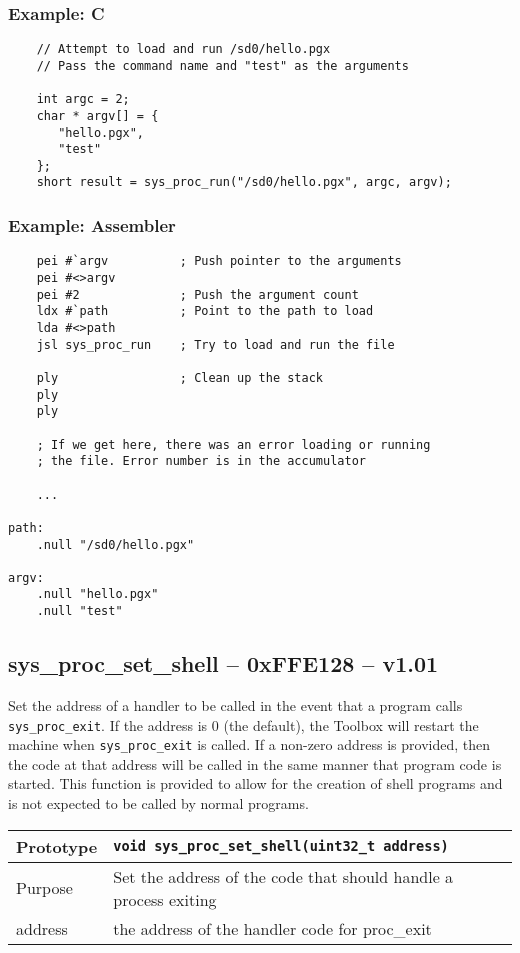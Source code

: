 \subsubsection*{Example: C}
\begin{lstlisting}
    // Attempt to load and run /sd0/hello.pgx
    // Pass the command name and "test" as the arguments

    int argc = 2;
    char * argv[] = {
       "hello.pgx",
       "test"
    };
    short result = sys_proc_run("/sd0/hello.pgx", argc, argv);
\end{lstlisting}

\subsubsection*{Example: Assembler}
\begin{verbatim}
    pei #`argv          ; Push pointer to the arguments
    pei #<>argv
    pei #2              ; Push the argument count
    ldx #`path          ; Point to the path to load
    lda #<>path
    jsl sys_proc_run    ; Try to load and run the file

    ply                 ; Clean up the stack
    ply
    ply

    ; If we get here, there was an error loading or running
    ; the file. Error number is in the accumulator

    ...

path:
    .null "/sd0/hello.pgx"

argv:
    .null "hello.pgx"
    .null "test"
\end{verbatim}

\subsection*{sys\_proc\_set\_shell -- 0xFFE128 -- v1.01}
Set the address of a handler to be called in the event that a program calls \lstinline|sys_proc_exit|.
If the address is 0 (the default), the Toolbox will restart the machine when \lstinline|sys_proc_exit| is called.
If a non-zero address is provided, then the code at that address will be called in the same manner that program code
is started.
This function is provided to allow for the creation of shell programs and is not expected to be called by normal programs.

\bigskip

\begin{table}[!h]\begin{tabular}{|l||l|} \hline
Prototype & \lstinline!void sys_proc_set_shell(uint32_t address)! \\ \hline
Purpose & Set the address of the code that should handle a process exiting \\ \hline
address & the address of the handler code for proc\_exit \\ \hline
\end{tabular}\end{table}


